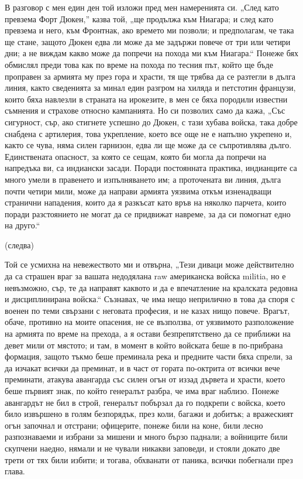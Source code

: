 \documentclass[12pt]{book}
\begin{document}
В разговор с мен един ден той изложи пред мен намеренията си. „След като превзема Форт Дюкен,” казва той, „ще продължа към Ниагара; и след като превзема и него, към Фронтнак, ако времето ми позволи; и предполагам, че така ще стане, защото Дюкен едва ли може да ме задържи повече от три или четири дни; а не виждам какво може да попречи на похода ми към Ниагара.“ Понеже бях обмислял преди това как по време на похода по тесния път, който ще бъде проправен за армията му през гора и храсти, тя ще трябва да се разтегли в дълга линия, както сведенията за минал един разгром на хиляда и петстотин французи, които бяха навлезли в страната на ирокезите, в мен се бяха породили известни съмнения и страхове относно кампанията. Но си позволих само да кажа, „Със сигурност, сър, ако стигнете успешно до Дюкен, с тази хубава войска, така добре снабдена с артилерия, това укрепление, което все още не е напълно укрепено и, както се чува, няма силен гарнизон, едва ли ще може да се съпротивлява дълго. Единствената опасност, за която се сещам, която би могла да попречи на напредъка ви, са индиански засади. Поради постоянната практика, индианците са много умели в правенето и изпълняването им; а проточената ви линия, дълга почти четири мили, може да направи армията уязвима откъм изненадващи странични нападения, които да я разкъсат като връв на няколко парчета, които поради разстоянието не могат да се придвижат навреме, за да си помогнат едно на друго.“

(следва)

Той се усмихна на невежеството ми и отвърна, „Тези диваци може действително да са страшен враг за вашата недодялана raw американска войска militia, но е невъзможно, сър, те да направят каквото и да е впечатление на кралската редовна и дисциплинирана войска.“ Съзнавах, че има нещо неприлично в това да споря с военен по теми свързани с неговата професия, и не казах нищо повече. Врагът, обаче, противно на моите опасения, не се възползва, от уязвимото разположение на армията по време на прехода, а я остави безпрепятствено да се приближи на девет мили от мястото; и там, в момент в който войската беше в по-прибрана формация, защото тъкмо беше преминала река и предните части бяха спрели, за да изчакат всички да преминат, и в част от гората по-октрита от всички вече преминати, атакува авангарда със силен огън от иззад дървета и храсти, което беше първият знак, по който генералът разбра, че има враг наблизо. Понеже авангардът не бил в строй, генералът побързал да го подкрепи с войска, което било извършено в голям безпорядък, през коли, багажи и добитък; а вражеският огън започнал и отстрани; офицерите, понеже били на коне, били лесно разпознаваеми и избрани за мишени и много бързо паднали; а войниците били скупчени наедно, нямали и не чували никакви заповеди, и стояли докато две трети от тях били избити; и тогава, обхванати от паника, всички побегнали през глава.
\end{document}
